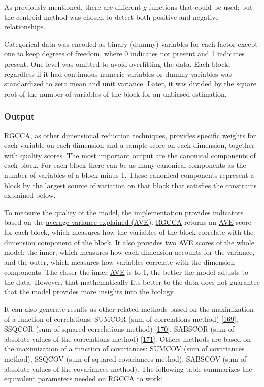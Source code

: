 \documentclass[
  12pt,
  a4paper,
  twoside,
  openright]{book}
\begin{document}
As previously mentioned, there are different \(g\) functions that could be used; but the centroid method was chosen to detect both positive and negative relationships.

Categorical data was encoded as binary (dummy) variables for each factor except one to keep degrees of freedom, where 0 indicates not present and 1 indicates present.
One level was omitted to avoid overfitting the data.
Each block, regardless if it had continuous numeric variables or dummy variables was standardized to zero mean and unit variance.
Later, it was divided by the square root of the number of variables of the block for an unbiased estimation.

\hypertarget{rgcca-output}{%
\subsubsection{Output}\label{rgcca-output}}

\protect\hyperlink{acronyms_RGCCA}{RGCCA}, as other dimensional reduction techniques, provides specific weights for each variable on each dimension and a sample score on each dimension, together with quality scores.
The most important output are the canonical components of each block.
For each block there can be as many canonical components as the number of variables of a block minus 1.
These canonical components represent a block by the largest source of variation on that block that satisfies the constrains explained below.

To measure the quality of the model, the implementation provides indicators based on the \protect\hyperlink{acronyms_AVE}{average variance explained (AVE)}.
\protect\hyperlink{acronyms_RGCCA}{RGCCA} returns an \protect\hyperlink{acronyms_AVE}{AVE} score for each block, which measures how the variables of the block correlate with the dimension component of the block.
It also provides two \protect\hyperlink{acronyms_AVE}{AVE} scores of the whole model: the inner, which measures how each dimension accounts for the variance, and the outer, which measures how variables correlate with the dimension components.
The closer the inner \protect\hyperlink{acronyms_AVE}{AVE} is to 1, the better the model adjusts to the data.
However, that mathematically fits better to the data does not guarantee that the model provides more insights into the biology.

It can also generate results as other related methods based on the maximization of a function of correlations: SUMCOR (sum of correlations method) {[}\protect\hyperlink{ref-horst1961}{169}{]}, SSQCOR (sum of squared correlations method) {[}\protect\hyperlink{ref-kettenring1971}{170}{]}, SABSCOR (sum of absolute values of the correlations method) {[}\protect\hyperlink{ref-vandegeer1984}{171}{]}.
Others methods are based on the maximization of a function of covariances: SUMCOV (sum of covariances method), SSQCOV (sum of squared covariances method), SABSCOV (sum of absolute values of the covariances method).
The following table summarizes the equivalent parameters needed on \protect\hyperlink{acronyms_RGCCA}{RGCCA} to work:
\end{document}
